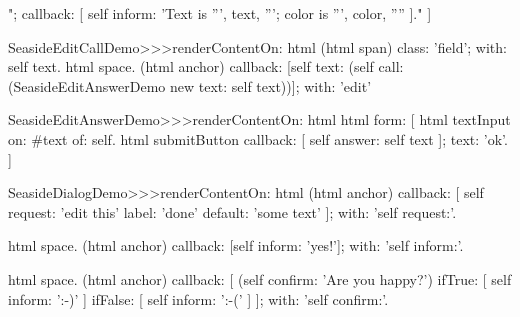 \documentclass[a4paper,10pt,twoside]{book}
\begin{document}
\begin{code}{}
			";
			callback: [ self inform: 'Text is ''', text, '''; color is ''', color, '''' ]."
		]


SeasideEditCallDemo>>>renderContentOn: html 
	(html span)
		class: 'field';
		with: self text.
	html space.
	(html anchor)
		callback: 
				[self text: (self call: (SeasideEditAnswerDemo new text: self text))];
		with: 'edit'


SeasideEditAnswerDemo>>>renderContentOn: html
	html form: [
		html textInput
			on: #text of: self.
		html submitButton
			callback: [ self answer: self text ];
			text: 'ok'.
		]

SeasideDialogDemo>>>renderContentOn: html
	(html anchor)
		callback: [ self request: 'edit this' label: 'done' default: 'some text' ];
		with: 'self request:'.

	html space.
	(html anchor)
		callback: [self inform: 'yes!'];
		with: 'self inform:'.
		
	html space.
	(html anchor)
		callback: [
				(self confirm: 'Are you happy?')
					ifTrue: [ self inform: ':-)' ]
					ifFalse: [ self inform: ':-(' ]
				];
		with: 'self confirm:'.

\end{code}
\end{document}
